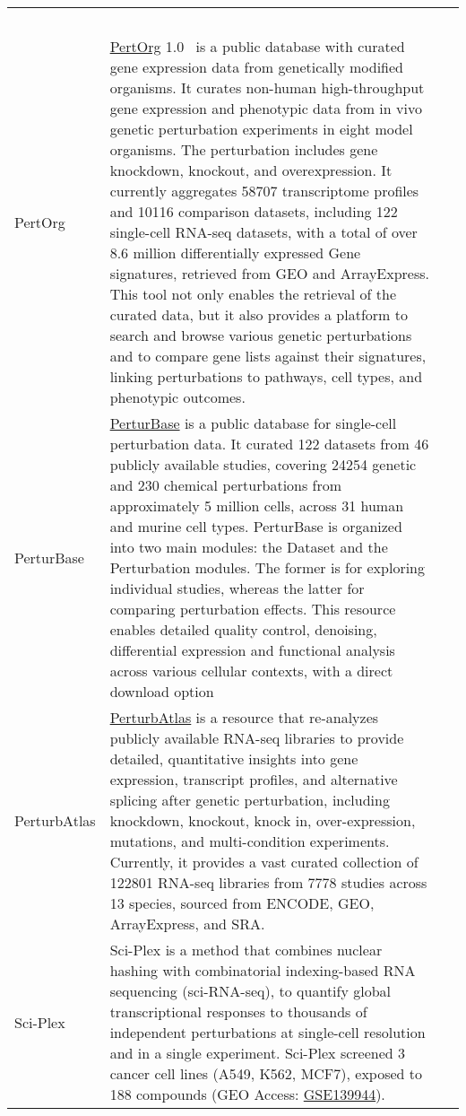 \begin{newpdflayout}{210mm}{297mm}
\begin{center}
\begin{longtable}{@{} p{} p{} p{} @{}}
  ~\cite{RN120} \\
PertOrg &
  \href{http://www.inbirg.com/pertorg/home}{PertOrg} 1.0~\cite{RN87} is a public database with curated gene expression data from genetically modified organisms. It curates non-human high-throughput gene expression and phenotypic data from in vivo genetic perturbation experiments in eight model organisms. The perturbation includes gene knockdown, knockout, and overexpression. It currently aggregates 58707 transcriptome profiles and 10116 comparison datasets, including 122 single-cell RNA-seq datasets, with a total of over 8.6 million differentially expressed \gls{Gene signature}s, retrieved from GEO and ArrayExpress. This tool not only enables the retrieval of the curated data, but it also provides a platform to search and browse various genetic perturbations and to compare gene lists against their signatures, linking perturbations to pathways, cell types, and phenotypic outcomes. &
  ~\cite{RN85} \\
PerturBase &
  \href{http://www.perturbase.cn/}{PerturBase} is a public database for single-cell perturbation data. It curated 122 datasets from 46 publicly available studies, covering 24254 genetic and 230 chemical perturbations from approximately 5 million cells, across 31 human and murine cell types. PerturBase is organized into two main modules: the Dataset and the Perturbation modules. The former is for exploring individual studies, whereas the latter for comparing perturbation effects. This resource enables detailed quality control, denoising, differential expression and functional analysis across various cellular contexts, with a direct download option &
  ~\cite{RN97} \\
PerturbAtlas &
  \href{https://perturbatlas.kratoss.site/#/}{PerturbAtlas} is a resource that re-analyzes publicly available RNA-seq libraries to provide detailed, quantitative insights into gene expression, transcript profiles, and alternative splicing after genetic perturbation, including knockdown, knockout, knock in, over-expression, mutations, and multi-condition experiments. Currently, it provides a vast curated collection of 122801 RNA-seq libraries from 7778 studies across 13 species, sourced from ENCODE, GEO, ArrayExpress, and SRA. &
  ~\cite{RN129} \\
Sci-Plex &
  Sci-Plex is a method that combines nuclear hashing with combinatorial indexing-based RNA sequencing (sci-RNA-seq), to quantify global transcriptional responses to thousands of independent perturbations at single-cell resolution and in a single experiment. Sci-Plex screened 3 cancer cell lines (A549, K562, MCF7), exposed to 188 compounds (GEO Access: \href{https://www.ncbi.nlm.nih.gov/geo/query/acc.cgi?acc=GSE139944}{GSE139944}). &

\end{longtable}
\end{center}
\end{newpdflayout}
